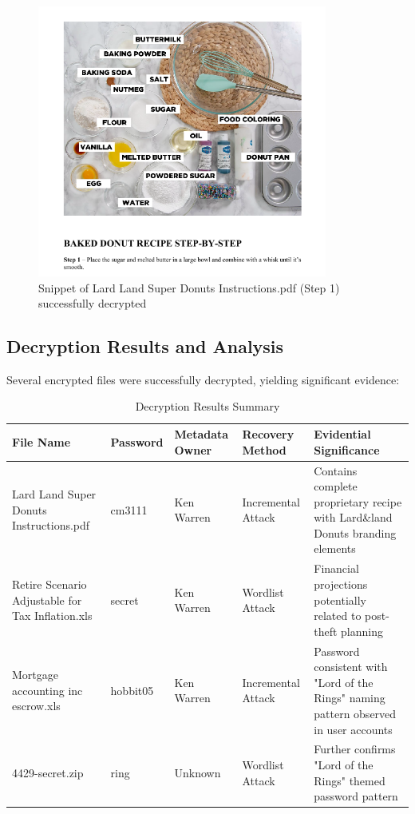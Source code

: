 \begin{figure}[h]
    \centering
    \includegraphics[width=0.85\textwidth]{images/Artifact and Evidence Recovery/LardLandPDF.png}
    \caption{Snippet of Lard Land Super Donuts Instructions.pdf (Step 1) successfully decrypted}
    \label{fig:decrypted_pdf}
\end{figure}

\subsection{Decryption Results and Analysis}
Several encrypted files were successfully decrypted, yielding significant evidence:

\begin{table}[htbp]
\centering
\begin{tabular}{|p{4cm}|p{2cm}|p{2cm}|p{2cm}|p{5cm}|}
\hline
\textbf{File Name} & \textbf{Password} & \textbf{Metadata Owner} & \textbf{Recovery Method} & \textbf{Evidential Significance} \\
\hline
Lard Land Super Donuts Instructions.pdf & cm3111 & Ken Warren & Incremental Attack & Contains complete proprietary recipe with Lard\&land Donuts branding elements \\
\hline
Retire Scenario Adjustable for Tax Inflation.xls & secret & Ken Warren & Wordlist Attack & Financial projections potentially related to post-theft planning \\
\hline
Mortgage accounting inc escrow.xls & hobbit05 & Ken Warren & Incremental Attack & Password consistent with "Lord of the Rings" naming pattern observed in user accounts \\
\hline
4429-secret.zip & ring & Unknown & Wordlist Attack & Further confirms "Lord of the Rings" themed password pattern \\
\hline
\end{tabular}
\caption{Decryption Results Summary}
\label{table:decryption_summary}
\end{table}

